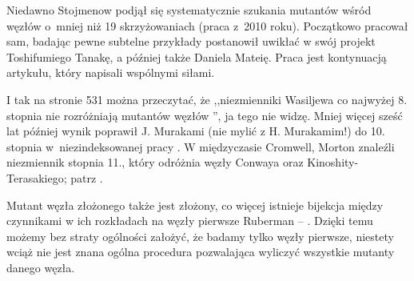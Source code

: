 Niedawno Stojmenow podjął się systematycznie szukania mutantów wśród węzłów o~mniej niż 19 skrzyżowaniach (praca \cite{stoimenow2010} z~2010 roku).
%
Początkowo pracował sam, badając pewne subtelne przykłady postanowił uwikłać w swój projekt Toshifumiego Tanakę, a później także Daniela Mateię.
%
%
Praca \cite{stoimenow2010} jest kontynuacją artykułu, który napisali wspólnymi siłami.

I tak na stronie 531 można przeczytać, że ,,niezmienniki Wasiljewa co najwyżej 8. stopnia nie rozróżniają mutantów węzłów \cite{chmutov1994}'', ja tego nie widzę.
%
Mniej więcej sześć lat później wynik poprawił J. Murakami (nie mylić z H. Murakamim!) do 10. stopnia w~niezindeksowanej pracy \cite{murakami1999}.
W międzyczasie Cromwell, Morton znaleźli niezmiennik stopnia 11., który odróżnia węzły Conwaya oraz Kinoshity-Terasakiego; patrz \cite{cromwell1996}.
%
%

Mutant węzła złożonego także jest złożony, co więcej istnieje bijekcja między czynnikami w ich rozkładach na węzły pierwsze Ruberman -- \cite{ruberman1987}.
%
Dzięki temu możemy bez straty ogólności założyć, że badamy tylko węzły pierwsze, niestety wciąż nie jest znana ogólna procedura pozwalająca wyliczyć wszystkie mutanty danego węzła.

